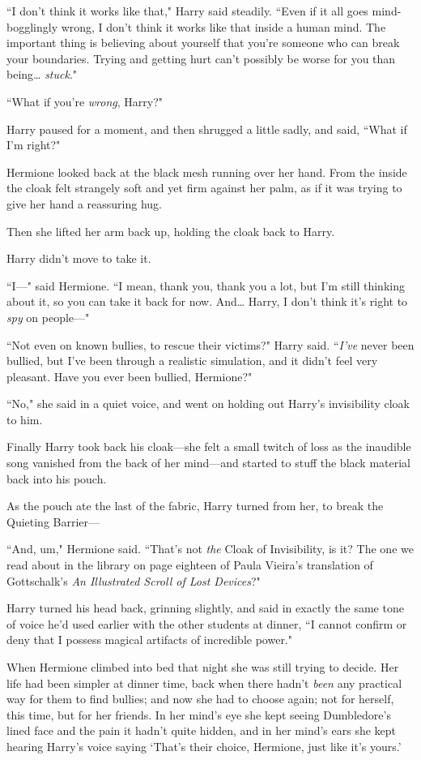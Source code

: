 ``I don't think it works like that," Harry said steadily. ``Even if it all goes mind-bogglingly wrong, I don't think it works like that inside a human mind. The important thing is believing about yourself that you're someone who can break your boundaries. Trying and getting hurt can't possibly be worse for you than being{\ldots} \emph{stuck}."

``What if you're \emph{wrong}, Harry?"

Harry paused for a moment, and then shrugged a little sadly, and said, ``What if I'm right?"

Hermione looked back at the black mesh running over her hand. From the inside the cloak felt strangely soft and yet firm against her palm, as if it was trying to give her hand a reassuring hug.

Then she lifted her arm back up, holding the cloak back to Harry.

Harry didn't move to take it.

``I—" said Hermione. ``I mean, thank you, thank you a lot, but I'm still thinking about it, so you can take it back for now. And{\ldots} Harry, I don't think it's right to \emph{spy} on people—"

``Not even on known bullies, to rescue their victims?" Harry said. ``\emph{I've} never been bullied, but I've been through a realistic simulation, and it didn't feel very pleasant. Have you ever been bullied, Hermione?"

``No," she said in a quiet voice, and went on holding out Harry's invisibility cloak to him.

Finally Harry took back his cloak—she felt a small twitch of loss as the inaudible song vanished from the back of her mind—and started to stuff the black material back into his pouch.

As the pouch ate the last of the fabric, Harry turned from her, to break the Quieting Barrier—

``And, um," Hermione said. ``That's not \emph{the} Cloak of Invisibility, is it? The one we read about in the library on page eighteen of Paula Vieira's translation of Gottschalk's \emph{An Illustrated Scroll of Lost Devices}?"

Harry turned his head back, grinning slightly, and said in exactly the same tone of voice he'd used earlier with the other students at dinner, ``I cannot confirm or deny that I possess magical artifacts of incredible power."

\later

When Hermione climbed into bed that night she was still trying to decide. Her life had been simpler at dinner time, back when there hadn't \emph{been} any practical way for them to find bullies; and now she had to choose again; not for herself, this time, but for her friends. In her mind's eye she kept seeing Dumbledore's lined face and the pain it hadn't quite hidden, and in her mind's ears she kept hearing Harry's voice saying `That's their choice, Hermione, just like it's yours.'

